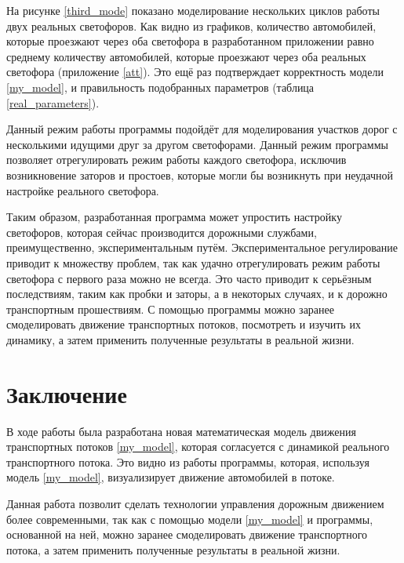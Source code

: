 \documentclass[12pt, a4paper]{extarticle}
\numberwithin{equation}{section}
\numberwithin{figure}{section}
\begin{document}
На рисунке \ref{third_mode} показано моделирование нескольких циклов работы двух реальных светофоров. Как видно из графиков, количество автомобилей, которые проезжают через оба светофора в разработанном приложении равно среднему количеству автомобилей, которые проезжают через оба реальных светофора (приложение \ref{att}). Это ещё раз подтверждает корректность модели \eqref{my_model}, и правильность подобранных параметров (таблица \ref{real_parameters}).

Данный режим работы программы подойдёт для моделирования участков дорог с несколькими идущими друг за другом светофорами. Данный режим программы позволяет отрегулировать режим работы каждого светофора, исключив возникновение заторов и простоев, которые могли бы возникнуть при неудачной настройке реального светофора.  

Таким образом, разработанная программа может упростить настройку светофоров, которая сейчас производится дорожными службами, преимущественно, экспериментальным путём. Экспериментальное регулирование приводит к множеству проблем, так как удачно отрегулировать режим работы светофора с первого раза можно не всегда. Это часто приводит к серьёзным последствиям, таким как пробки и заторы, а в некоторых случаях, и к дорожно транспортным прошествиям. С помощью программы можно заранее смоделировать движение транспортных потоков, посмотреть и изучить их динамику, а затем применить полученные результаты в реальной жизни.

\section*{Заключение}

В ходе работы была разработана новая математическая модель движения транспортных потоков \eqref{my_model}, которая согласуется с динамикой реального транспортного потока. Это видно из работы программы, которая, используя модель \eqref{my_model}, визуализирует движение автомобилей в потоке. 

Данная работа позволит сделать технологии управления дорожным движением более современными, так как с помощью модели \eqref{my_model} и программы, основанной на ней, можно заранее смоделировать движение транспортного потока, а затем применить полученные результаты в реальной жизни.
\end{document}
